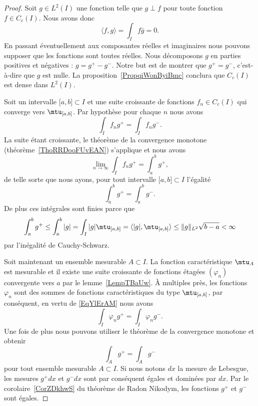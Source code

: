 \begin{proof}
	Soit \( g\in L^2(I)\) une fonction telle que \( g\perp f\) pour toute fonction \( f\in C_c(I)\). Nous avons donc
	\begin{equation}
		\langle f, g\rangle =\int_If\bar g=0.
	\end{equation}
	En passant éventuellement aux composantes réelles et imaginaires nous pouvons supposer que les fonctions sont toutes réelles. Nous décomposons \( g\) en parties positives et négatives : \( g=g^+-g^-\). Notre but est de montrer que \( g^+=g^-\), c'est-à-dire que \( g\) est nulle. La proposition~\ref{PropqiWonByiBmc} conclura que \( C_c(I)\) est dense dans \( L^2(I)\).

	Soit un intervalle \( \mathopen[ a , b \mathclose]\subset I\) et une suite croissante de fonctions \( f_n\in C_c(I)\) qui converge vers \( \mtu_{\mathopen[ a , b \mathclose]}\). Par hypothèse pour chaque \( n\) nous avons
	\begin{equation}
		\int_If_ng^+=\int_I f_ng^-.
	\end{equation}
	La suite étant croissante, le théorème de la convergence monotone (théorème~\ref{ThoRRDooFUvEAN}) s'applique et nous avons
	\begin{equation}
		\lim_{n\to \infty} \int_I f_ng^+=\int_a^bg^+,
	\end{equation}
	de telle sorte que nous ayons, pour tout intervalle \( \mathopen[ a , b \mathclose]\subset I\) l'égalité
	\begin{equation}        \label{EqYlErAM}
		\int_a^bg^+=\int_a^bg^-.
	\end{equation}
	De plus ces intégrales sont finies parce que
	\begin{equation}
		\int_a^b g^+\leq\int_a^b| g |=\int_I| g |\mtu_{\mathopen[ a , b \mathclose]}=\langle | g |, \mtu_{\mathopen[ a , b \mathclose]}\rangle \leq \| g \|_{L^2}\sqrt{b-a}<\infty
	\end{equation}
	par l'inégalité de Cauchy-Schwarz.

	Soit maintenant un ensemble mesurable \( A\subset I\). La fonction caractéristique \( \mtu_A\) est mesurable et il existe une suite croissante de fonctions étagées \( (\varphi_n)\) convergente vers \( a\) par le lemme~\ref{LempTBaUw}. À multiples près, les fonctions \( \varphi_n\) sont des sommes de fonctions caractéristiques du type \( \mtu_{\mathopen[ a , b \mathclose]}\), par conséquent, en vertu de \eqref{EqYlErAM} nous avons
	\begin{equation}
		\int_I\varphi_ng^+=\int_I\varphi_ng^-.
	\end{equation}
	Une fois de plus nous pouvons utiliser le théorème de la convergence monotone et obtenir
	\begin{equation}
		\int_Ag^+=\int_A g^-
	\end{equation}
	pour tout ensemble mesurable \( A\subset I\). Si nous notons \( dx\) la mesure de Lebesgue, les mesures \( g^+dx\) et \( g^-dx\) sont par conséquent égales et dominées par \( dx\). Par le corolaire~\ref{CorZDkhwS} du théorème de Radon Nikodym, les fonctions \( g^+\) et \( g^-\) sont égales.
\end{proof}

